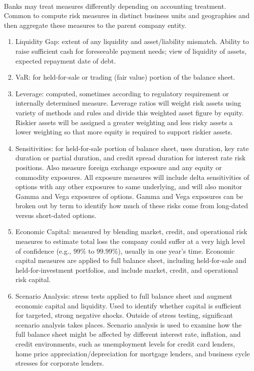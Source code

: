 \begin{remark} \\
Banks may treat measures differently depending on accounting treatment.\\
Common to compute risk measures in distinct business units and geographies and then aggregate these measures to the parent company entity.
\begin{enumerate}[label=\roman*.]
\setlength{\itemsep}{0pt}
\item Liquidity Gap: extent of any liquidity and asset/liability mismatch. Ability to raise sufficient cash for foreseeable payment needs; view of liquidity of assets, expected repayment date of debt.
\item VaR: for held-for-sale or trading (fair value) portion of the balance sheet.
\item Leverage: computed, sometimes according to regulatory requirement or internally determined measure. Leverage ratios will weight risk assets using variety of methods and rules and divide this weighted asset figure by equity. Riskier assets will be assigned a greater weighting and less risky assets a lower weighting so that more equity is required to support riskier assets.
\item Sensitivities: for held-for-sale portion of balance sheet, uses duration, key rate duration or partial duration, and credit spread duration for interest rate risk positions. Also measure foreign exchange exposure and any equity or commodity exposures. All exposure measures will include delta sensitivities of options with any other exposures to same underlying, and will also monitor Gamma and Vega exposures of options. Gamma and Vega exposures can be broken out by term to identify how much of these risks come from long-dated versus short-dated options.
\item Economic Capital: measured by blending market, credit, and operational risk measures to estimate total loss the company could suffer at a very high level of confidence (e.g., $99\%$ to $99.99\%$), usually in one year’s time. Economic capital measures are applied to full balance sheet, including held-for-sale and held-for-investment portfolios, and include market, credit, and operational risk capital.
\item Scenario Analysis: stress tests applied to full balance sheet and augment economic capital and liquidity. Used to identify whether capital is sufficient for targeted, strong negative shocks. Outside of stress testing, significant scenario analysis takes places. Scenario analysis is used to examine how the full balance sheet might be affected by different interest rate, inflation, and credit environments, such as unemployment levels for credit card lenders, home price appreciation/depreciation for mortgage lenders, and business cycle stresses for corporate lenders.
\end{enumerate}
\end{remark}

